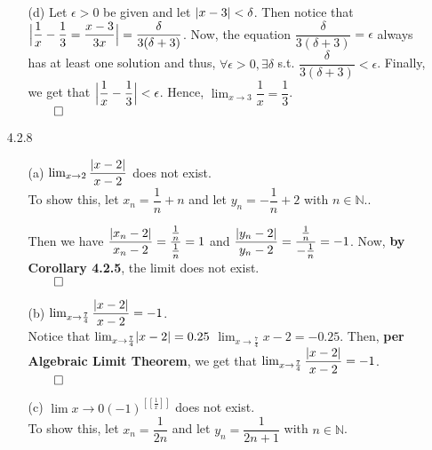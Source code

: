 \documentclass[11pt]{article}
\DeclarePairedDelimiter\abs{\lvert}{\rvert}%
\DeclarePairedDelimiter\absb{\Big\lvert}{\Big\rvert}%
\newcommand{\nats}{\mathbb{N}}
\begin{document}
\begin{itemize}
\begin{itemize}
            \item[(d)]
                Let $\epsilon > 0$ be given and let $\abs{x - 3} < \delta$.
                Then notice that $\absb{\dfrac{1}{x} - \dfrac{1}{3} = \dfrac{x
                - 3}{3x}} = \dfrac{\delta}{3(\delta + 3)}$. Now, the equation
                $\dfrac{\delta}{3(\delta + 3)} = \epsilon$ always has at least
                one solution and thus, $\forall \epsilon > 0, \exists \delta$
                s.t. $\dfrac{\delta}{3(\delta + 3)} < \epsilon$. Finally, we
                get that $\absb{\dfrac{1}{x} - \dfrac{1}{3}} < \epsilon$.
                Hence, $\lim_{x \to 3} \dfrac{1}{x} = \dfrac{1}{3}$.\\
                $\qed$
                
        \end{itemize}

    \item[4.2.8]
        \begin{itemize}
            \item[(a)]
                $\lim_{x \to 2} \dfrac{\abs{x - 2}}{x - 2}$ does not exist.
                \\
                To show this, let $x_n = \dfrac{1}{n} + n$ and let $y_n =
                -\dfrac{1}{n} + 2$ with $n \in \nats$..

                Then we have $\dfrac{\abs{x_n - 2}}{x_n - 2} =
                \dfrac{\frac{1}{n}}{\frac{1}{n}} = 1$ and $\dfrac{\abs{y_n -
                2}}{y_n - 2} = \dfrac{\frac{1}{n}}{-\frac{1}{n}} = -1$.
                Now, \textbf{by Corollary 4.2.5}, the limit does not exist.\\
                $\qed$

            \item[(b)]
                $\lim_{x \to \frac{7}{4}} \dfrac{\abs{x - 2}}{x - 2} = -1$.
                \\
                Notice that $\lim_{x \to \frac{7}{4}} \abs{x - 2} = 0.25$
                $\lim_{x \to \frac{7}{4}} x - 2 = -0.25$. Then, \textbf{per
                Algebraic Limit Theorem}, we get that $\lim_{x \to \frac{7}{4}}
                \dfrac{\abs{x - 2}}{x - 2} = -1$.\\
                $\qed$

            \item[(c)]
                $\lim{x \to 0} (-1)^{[[\frac{1}{x}]]}$ does not exist.
                \\
                To show this, let $x_n = \dfrac{1}{2n}$ and let $y_n =
                \dfrac{1}{2n + 1}$ with $n \in \nats$.


\end{itemize}
\end{itemize}
\end{document}
